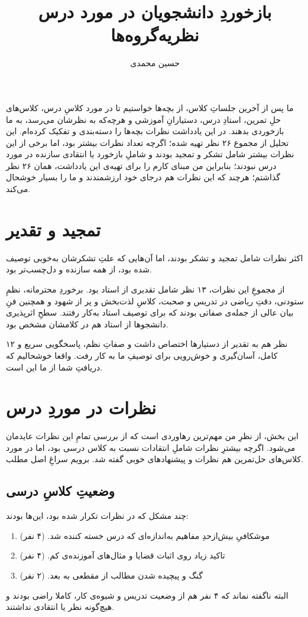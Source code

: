 \documentclass[]{article}
\title{
بازخوردِ دانشجویان در مورد درس نظریه‌گروه‌ها
}
\author{حسین محمدی }
\numberwithin{equation}{section}
\begin{document}
\maketitle
ما پس از آخرین جلساتِ کلاس، از بچه‌ها خواستیم تا در مورد کلاسِ درس، کلاس‌های حلِ تمرین، استادِ درس، دستیارانِ آموزشی و هرچه‌که به نظرشان می‌رسد‌، به ما بازخوردی بدهند. در این یادداشت نظرات بچه‌ها را دسته‌بندی و تفکیک کرده‌ام. این تحلیل از مجموع ۲۶ نظر تهیه شده؛ اگرچه تعداد نظرات بیشتر بود، اما برخی از این نظرات بیشتر شامل تشکر و تمجید بودند و شاملِ بازخورد یا انتقادی  سازنده در مورد درس نبودند؛ بنابراین من مبنای کارم را برای تهیه‌ی این یادداشت، همان ۲۶ نظر گذاشتم؛ هرچند که این نظرات هم درجای خود ارزشمندند و ما را بسیار خوشحال می‌کند.

\section*{تمجید و تقدیر}
اکثر نظرات شامل تمجید و تشکر بودند، اما آن‌هایی که علتِ تشکرشان به‌خوبی توصیف شده بود، از همه سازنده و دل‌چسب‌تر بود.

از مجموعِ این نظرات، ۱۳ نظر شامل تقدیری از استاد بود. برخوردِ محترمانه، نظمِ ستودنی، دقتِ ریاضی در تدریس و صحبت، کلاسِ لذت‌بخش و پر از شهود و همچنین فنِ بیان عالی از جمله‌ی صفاتی بودند که برای توصیف استاد به‌کار رفتند. سطحِ اثرپذیری دانشجوها از استاد هم در کلامشان مشخص بود. 

 ۱۲ نظر هم به تقدیر از دستیارها اختصاص داشت و صفاتِ نظم، پاسخگویی سریع و کامل، آسان‌گیری و خوش‌رویی برای توصیفِ ما به کار رفت. واقعا خوشحالیم که دریافتِ شما از ما این است.


\section*{نظرات در موردِ درس}
این بخش، از نظرِ من مهم‌ترین رهاوردی است که از بررسی تمامِ این نظرات عایدمان می‌شود. اگرچه بیشترِ نظرات شاملِ انتقادات نسبت به کلاس درسی بود، اما در مورد کلاس‌های حل‌تمرین هم نظرات و پیشنهادهای خوبی گفته شد. برویم سراغِ اصل مطلب.
\subsection*{وضعیتِ کلاسِ درسی}
چند مشکل که در نظرات تکرار شده بود، این‌ها بودند: 
\begin{enumerate}
	\item موشکافیِ بیش‌ازحدِ مفاهیم به‌اندازه‌ای که درس خسته کننده شد. (۴ نفر)
	\item تاکید زیاد روی اثبات قضایا و مثال‌های آموزنده‌ی کم. (۴ نفر)
	\item گنگ و پیچیده شدن مطالب از مقطعی به بعد. (۲ نفر)
\end{enumerate}
البته ناگفته نماند که ۴ نفر هم از وضعیت تدریس و شیوه‌ی کار، کاملا راضی بودند و هیچ‌گونه نظر یا انتقادی نداشتند.
\end{document}
